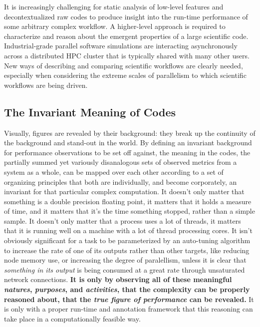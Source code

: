 

It is increasingly challenging for static analysis of low-level
features and decontextualized raw codes to produce insight into the
run-time performance of some arbitrary complex workflow.
%
A higher-level approach is required to characterize and reason about
the emergent properties of a large scientific code.
%
Industrial-grade parallel software simulations are interacting
asynchronously across a distributed HPC cluster that is typically
shared with many other users.
%
New ways of describing and comparing scientific workflows are clearly
needed, especially when considering the extreme scales of parallelism
to which scientific workflows are being driven.



\subsection{The Invariant Meaning of Codes}

Visually, figures are revealed by their background: they break up the
continuity of the background and stand-out in the world.
%
By defining an invariant background for performance observations to be
set off against, the meaning in the codes, the partially summed yet
variously disanalogous sets of observed metrics from a system as a
whole, can be mapped over each other according to a set of organizing
principles that both are individually, and become corporately, an
invariant for that particular complex computation.
%
It doesn't only matter that something is a double precision floating
point, it matters that it holds a measure of time, and it matters that
it's the time something stopped, rather than a simple sample.
%
It doesn't only matter that a process uses a lot of threads, it
matters that it is running well on a machine with a lot of thread
processing cores.
%
It isn't obviously significant for a task to be parameterized by an
auto-tuning algorithm to increase the rate of one of its outputs
rather than other targets, like reducing node memory use, or
increasing the degree of paralellism, unless it is clear that
\textit{something in its output} is being consumed at a great rate
through unsaturated network connections.
%
\textbf{It is only by observing all of these meaningful
  \textit{natures}, \textit{purposes}, and \textit{activities}, that
  the complexity can be properly reasoned about, that the \textit{true
    figure of performance} can be revealed.}
%
It is only with a proper run-time and annotation framework that this
reasoning can take place in a computationally feasible way.

